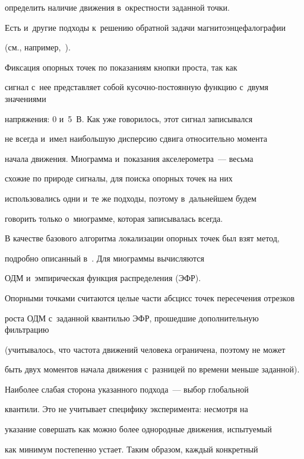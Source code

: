 определить наличие движения в~окрестности заданной точки.





Есть и~другие подходы к~решению обратной задачи магнитоэнцефалографии


(см., например,~\cite{bi_5, bi_6}).





Фиксация опорных точек по показаниям кнопки проста, так как


сигнал с~нее представляет собой ку\-соч\-но-по\-сто\-ян\-ную функцию с~двумя значениями


напряжения: 0 и~5~В. Как уже говорилось, этот сигнал записывался


не всегда и~имел наибольшую дисперсию сдвига относительно момента


начала движения. Миограмма и~показания акселерометра~--- весьма


схожие по природе сигналы, для поиска опорных точек на них


использовались одни и~те же подходы, поэтому в~дальнейшем будем


говорить только о~миограмме, которая записывалась всегда.





В качестве базового алгоритма локализации опорных точек был взят метод,


подробно описанный в~\cite{bi_2, bi_1}. Для миограммы вычисляются


ОДМ и~эмпирическая функция распределения (ЭФР).


Опорными точками считаются целые части абсцисс точек пересечения отрезков


роста ОДМ с~заданной квантилью ЭФР, прошедшие дополнительную фильтрацию


(учитывалось, что частота движений человека ограничена, поэтому не может


быть двух моментов начала движения с~разницей по времени меньше заданной).





Наиболее слабая сторона указанного подхода~--- выбор глобальной


квантили. Это не учитывает специфику эксперимента: несмотря на


указание совершать как можно более однородные движения, испытуемый


как минимум постепенно устает. Таким образом, каждый конкретный


